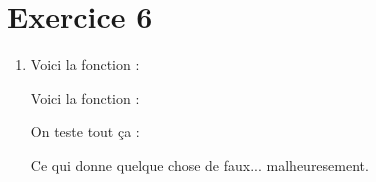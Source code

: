 \section{Exercice 6}
\begin{enumerate}
  \item


        Voici la fonction  :

        Voici la fonction  :
        \newpage

        On teste tout ça :

        Ce qui donne quelque chose de faux... malheuresement.

\end{enumerate}
